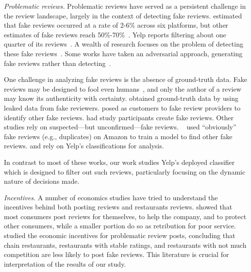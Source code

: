 \textit{Problematic reviews.} Problematic reviews have served as a persistent challenge in the review landscape, largely in the context of detecting fake reviews. \citet{ott2012estimating} estimated that fake reviews occurred at a rate of 2-6\% across six platforms, but other estimates of fake reviews reach 50\%-70\%~\cite{dwoskin2018merchants,elliott2018trust}. Yelp reports filtering about one quarter of its reviews~\cite{yelp2010recommend}. A wealth of research focuses on the problem of detecting these fake reviews~\cite{jindal2008opinion,martens2019towards,ye2016temporal,shehnepoor2017netspam,kumar2018rev2,harris2012detecting,mukherjee2013yelp}. Some works have taken an adversarial approach, generating fake reviews rather than detecting~\cite{adelani2020generating,juuti2018stay,yao2017automated}.

One challenge in analyzing fake reviews is the absence of ground-truth data. Fake reviews may be designed to fool even humans~\cite{ott2011finding}, and only the author of a review may know its authenticity with certainty. \citet{wang2016real} obtained ground-truth data by using leaked data from fake reviewers. \citet{martens2019towards} posed as customers to fake review providers to identify other fake reviews. \citet{ott2011finding} had study participants create fake reviews. Other studies rely on suspected---but unconfirmed---fake reviews. ~\citet{jindal2008opinion} used ``obviously'' fake reviews (e.g., duplicates) on Amazon to train a model to find other fake reviews. \citet{mukherjee2013yelp} and \citet{rayana2015collective} rely on Yelp's classifications for analysis.%

In contrast to most of these works, our work studies Yelp's deployed classifier which is designed to filter out such reviews, particularly focusing on the dynamic nature of decisions made.%

\textit{Incentives.} A number of economics studies have tried to understand the incentives behind both posting reviews and restaurants reviews. \citet{yoo2008motivates} showed that most consumers post reviews for themselves, to help the company, and to protect other consumers, while a smaller portion do so as retribution for poor service. \citet{luca2016fake} studied the economic incentives for problematic review posts, concluding that chain restaurants, restaurants with stable ratings, and restaurants with not much competition are less likely to post fake reviews. This literature is crucial for interpretation of the results of our study.

